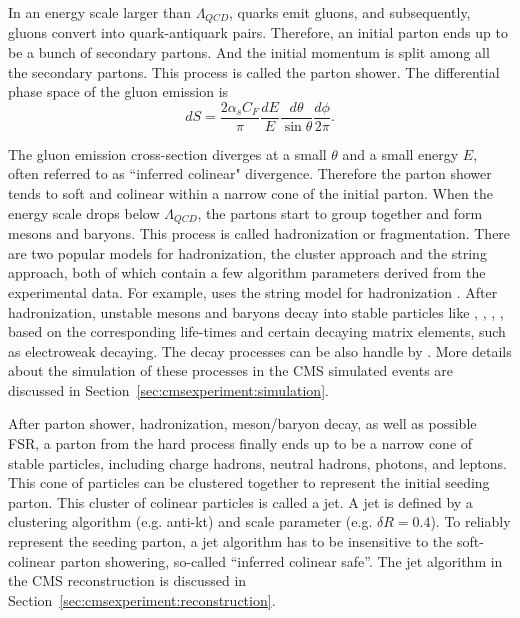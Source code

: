 In an energy scale larger than $\Lambda_{QCD}$, quarks emit gluons, and subsequently, gluons convert into quark-antiquark pairs. Therefore, an initial parton ends up to be a bunch of secondary partons. And the initial momentum is split among all the secondary partons. This process is called the parton shower. The differential phase space of the gluon emission is
\begin{equation}
    dS = \frac{2\alpha_s C_F}{\pi} \frac{dE}{E}\frac{d\theta}{\sin \theta} \frac{d\phi}{2\pi}.
\end{equation}

\noindent The gluon emission cross-section diverges at a small $\theta$ and a small energy $E$, often referred to as ``inferred colinear" divergence. Therefore the parton shower tends to soft and colinear within a narrow cone of the initial parton. 
When the energy scale drops below $\Lambda_{QCD}$, the partons start to group together and form mesons and baryons. This process is called hadronization or fragmentation. There are two popular models for hadronization, the cluster approach and the string approach, both of which contain a few algorithm parameters derived from the experimental data. For example, \PYTHIA uses the string model for hadronization \cite{ANDERSSON198331}. After hadronization, unstable mesons and baryons decay into stable particles like \PGp, \PK, \PGg, \Pe, \PGm based on the corresponding life-times and certain decaying matrix elements, such as electroweak decaying. The decay processes can be also handle by \PYTHIA. More details about the simulation of these processes in the CMS simulated events are discussed in Section~\ref{sec:cmsexperiment:simulation}.

After parton shower, hadronization, meson/baryon decay, as well as possible FSR, a parton from the hard process finally ends up to be a narrow cone of stable particles, including charge hadrons, neutral hadrons, photons, and leptons. This cone of particles can be clustered together to represent the initial seeding parton. This cluster of colinear particles is called a jet. A jet is defined by a clustering algorithm (e.g. anti-kt) and scale parameter (e.g. $\delta R=0.4$). To reliably represent the seeding parton, a jet algorithm has to be insensitive to the soft-colinear parton showering, so-called ``inferred colinear safe''. The jet algorithm in the CMS reconstruction is discussed in Section~\ref{sec:cmsexperiment:reconstruction}.

